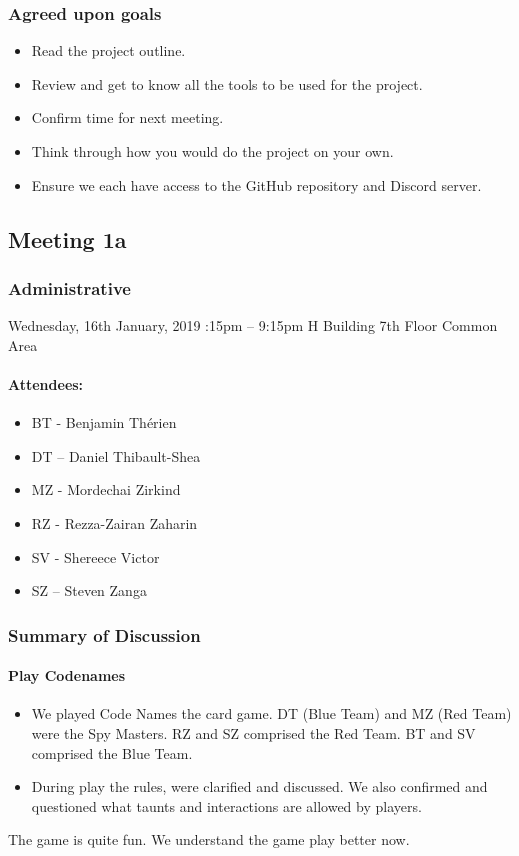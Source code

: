 \documentclass[10pt, a4paper]{article}
\begin{document}
			
			\subsubsection{Agreed upon goals}
			\begin{itemize}
				\item Read the project outline.
				\item Review and get to know all the tools to be used for the project.
				\item Confirm time for next meeting.
				\item Think through how you would do the project on your own. 
				\item Ensure we each have access to the GitHub repository and Discord server. 
			\end{itemize}
			
			\pagebreak
			
			\subsection{Meeting 1a }
			
			\subsubsection{Administrative}
			Wednesday, 16th January, 2019 :15pm – 9:15pm \textbar H Building 7th Floor Common Area 
			\paragraph{Attendees:}
			\begin{itemize}
				\item BT - Benjamin Th\'erien
				\item DT – Daniel Thibault-Shea
				\item MZ - Mordechai Zirkind 
				\item RZ - Rezza-Zairan Zaharin
				\item SV - Shereece Victor
				\item SZ – Steven Zanga
			\end{itemize}
			
			\subsubsection{Summary of Discussion }
			\paragraph{Play Codenames }
			\begin{itemize}
				\item We played Code Names the card game. DT (Blue Team) and MZ (Red Team) were the Spy Masters. RZ and SZ comprised the Red Team. BT and SV comprised the Blue Team. 
				\item During play the rules, were clarified and discussed. We also confirmed and questioned what taunts and interactions are allowed by players.   
			\end{itemize}
			The game is quite fun. We understand the game play better now. 
			
\end{document}
